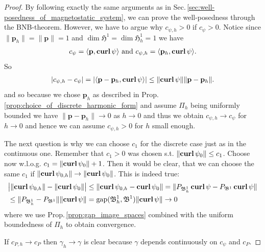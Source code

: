 \documentclass[../master_thesis.tex]{subfiles}
\begin{document}
\begin{proof}
    By following exactly the same arguments as in Sec.\,\ref{sec:well-posedness_of_magnetostatic_system}, 
    we can prove
    the well-posedness through the BNB-theorem. However, we have to argue
    why $c_{\psi,h}>0$ if $c_\psi>0$. 
    Notice since $ \lVert \mathbf{p}_h \rVert  = \lVert \mathbf{p} \rVert =1$
    and $\dim \mathfrak{H}^1 = \dim \mathfrak{H}^1_h = 1$
    we have 
    \begin{align*}
        c_\psi = \langle \mathbf{p}, \veccurl \psi \rangle 
        \text{ and } c_{\psi,h} = \langle \mathbf{p}_h, \veccurl \psi \rangle.
    \end{align*}
    So 
    \begin{align*}
        | c_{\psi,h} - c_\psi | = |\langle \mathbf{p} - \mathbf{p}_h, \veccurl \psi \rangle|
        \leq \lVert \veccurl \psi \rVert \lVert \mathbf{p} - \mathbf{p}_h \rVert.
    \end{align*}
    and so because we chose $\mathbf{p}_h$ as described in Prop.\,\ref{prop:choice_of_discrete_harmonic_form} 
    and assume $\Pi_h$ being 
    uniformly bounded we have $\lVert \mathbf{p} - \mathbf{p}_h \rVert \rightarrow 0$
    as $h\rightarrow 0$ and thus
    we obtain $c_{\psi,h} \rightarrow c_\psi$ for $h \rightarrow 0$ and hence 
    we can assume $c_{\psi,h} > 0$ for $h$ small enough.

    The next question is why we can choose $c_1$ for the discrete case just as 
    in the continuous one. Remember that $c_1>0$ was chosen 
    s.t. $\lVert \veccurl \psi_0 \rVert \leq c_1$. Choose now w.l.o.g. 
    $c_1 =  \lVert \veccurl \psi_0 \rVert + 1$. Then it would be clear, 
    that we can choose the same $c_1$ if $\lVert \veccurl \psi_{0,h} \rVert \rightarrow 
    \lVert \veccurl \psi_0 \rVert$. This is indeed true: 
    \begin{align*}
        &\big| \lVert \veccurl \psi_{0,h} \rVert - \lVert \veccurl \psi_0 \rVert \big|
        \leq \lVert \veccurl \psi_{0,h} -  \veccurl \psi_0 \rVert
        = \lVert P_{\mathfrak{B}^1_h}\veccurl \psi -  P_{\mathfrak{B}^1} \veccurl \psi \rVert
        \\ &\leq \lVert P_{\mathfrak{B}^1_h} -  P_{\mathfrak{B}^1} \rVert
            \lVert \veccurl \psi \rVert
        = \gap (\mathfrak{B}^1_h, \mathfrak{B}^1) \lVert \veccurl \psi \rVert
        \rightarrow 0
    \end{align*}
    where we use Prop.\,\ref{prop:gap_image_spaces} combined with the uniform boundedness 
    of $\Pi_h$ to obtain convergence.

    If $c_{P,h} \rightarrow c_P$ then $\gamma_h \rightarrow \gamma$ is clear because 
    $\gamma$ depends continuously on $c_{\psi}$ and $c_P$.
\end{proof}
\end{document}
